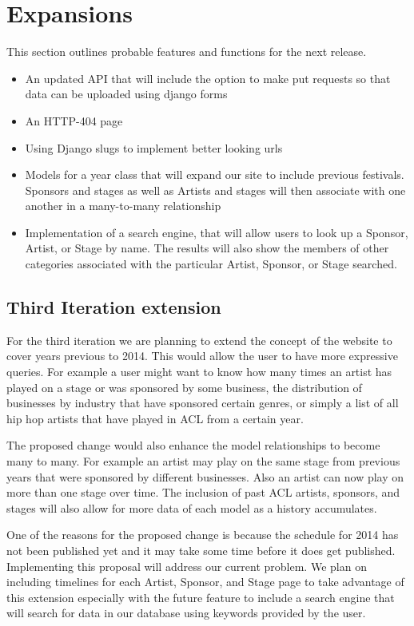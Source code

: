 \documentclass[12pt,english]{scrartcl}
\begin{document}
\section{Expansions}
This section outlines probable features and functions for the next release.
\begin{itemize}
\item An updated API that will include the option to make put requests so that data can be uploaded using django forms

\item An HTTP-404 page

\item Using Django slugs to implement better looking urls

\item Models for a year class that will expand our site to include previous festivals. Sponsors and stages as well as Artists and stages will then 
associate with one another in a many-to-many relationship

\item Implementation of a search engine, that will allow users to look up a Sponsor, Artist, or Stage by name. The results will also show the members 
of other categories associated with the particular Artist, Sponsor, or Stage searched.
\end{itemize}

\subsection{Third Iteration extension}

For the third iteration we are planning to extend the concept of the website to cover years previous to 2014. This would allow 
the user to have more  expressive queries. For example a user might want to know  how many times an artist has played on a stage
or was sponsored by some business, the distribution of businesses by industry that have sponsored certain genres, or simply a 
list of all hip hop artists that have played in ACL from a certain year.

The proposed change would also enhance the model relationships to become many to many. For example an artist may play on the same stage
from previous years that were sponsored by different businesses. Also an artist can now play on more than one stage over time. The 
inclusion of past ACL artists, sponsors, and stages will also allow for more data of each model as a history accumulates. 

One of the
reasons for the proposed change is because the schedule for 2014 has not been published yet and it may take some time before it does get published.
Implementing this proposal will address our current problem. We plan on including timelines for each Artist, Sponsor, and Stage page to take advantage of this extension
especially with the future feature to include a search engine that will search for data in our database using keywords provided by the user. 
\end{document}
